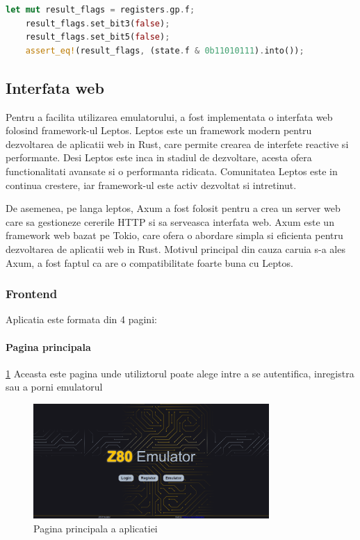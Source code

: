 \documentclass[titlepage,12pt]{article}
\begin{document}
\begin{lstlisting}[language=Rust,caption={Ignorarea bitilor nedocumentati din testare},label={lst:testingignore35flags}]
    let mut result_flags = registers.gp.f;
    result_flags.set_bit3(false);
    result_flags.set_bit5(false);
    assert_eq!(result_flags, (state.f & 0b11010111).into());
\end{lstlisting}
\subsection{Interfata web}

Pentru a facilita utilizarea emulatorului, a fost implementata o interfata web folosind framework-ul Leptos. Leptos este un framework modern pentru dezvoltarea de aplicatii web in Rust, care permite crearea de interfete reactive si performante. Desi Leptos este inca in stadiul de dezvoltare, acesta ofera functionalitati avansate si o performanta ridicata. Comunitatea Leptos este in continua crestere, iar framework-ul este activ dezvoltat si intretinut.

De asemenea, pe langa leptos, Axum a fost folosit pentru a crea un server web care sa gestioneze cererile HTTP si sa serveasca interfata web. Axum este un framework web bazat pe Tokio, care ofera o abordare simpla si eficienta pentru dezvoltarea de aplicatii web in Rust.
Motivul principal din cauza caruia s-a ales Axum, a fost faptul ca are o compatibilitate foarte buna cu Leptos.

\subsubsection{Frontend}

Aplicatia este formata din 4 pagini:
\paragraph {Pagina principala} \cref {fig:homepage} Aceasta este pagina unde utiliztorul poate alege intre a se autentifica, inregistra sau a porni emulatorul
\begin{figure}[h!]
    \centering
    \includegraphics[width=0.8\textwidth]{images/homepage.png}
    \caption{Pagina principala a aplicatiei}
    \label{fig:homepage}
\end{figure}
\end{document}
